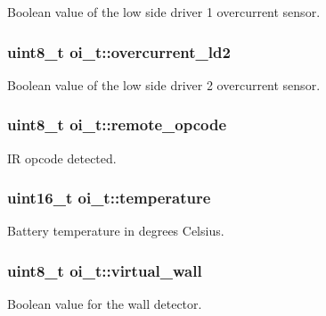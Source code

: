 Boolean value of the low side driver 1 overcurrent sensor. 

\hypertarget{structoi__t_a9f310b5da0c5b3d83a68ccbdc0339527}{
\subsubsection[{overcurrent\_\-ld2}]{\setlength{\rightskip}{0pt plus 5cm}uint8\_\-t {\bf oi\_\-t::overcurrent\_\-ld2}}}
\label{structoi__t_a9f310b5da0c5b3d83a68ccbdc0339527}


Boolean value of the low side driver 2 overcurrent sensor. 

\hypertarget{structoi__t_a7bfafbcc62f7eb3939b7bcd72065c377}{
\subsubsection[{remote\_\-opcode}]{\setlength{\rightskip}{0pt plus 5cm}uint8\_\-t {\bf oi\_\-t::remote\_\-opcode}}}
\label{structoi__t_a7bfafbcc62f7eb3939b7bcd72065c377}


IR opcode detected. 

\hypertarget{structoi__t_a9e162ade52f5b71fb92ac67c0cf76f76}{
\subsubsection[{temperature}]{\setlength{\rightskip}{0pt plus 5cm}uint16\_\-t {\bf oi\_\-t::temperature}}}
\label{structoi__t_a9e162ade52f5b71fb92ac67c0cf76f76}


Battery temperature in degrees Celsius. 

\hypertarget{structoi__t_a248f5290596d9691d446f8de7c38342f}{
\subsubsection[{virtual\_\-wall}]{\setlength{\rightskip}{0pt plus 5cm}uint8\_\-t {\bf oi\_\-t::virtual\_\-wall}}}
\label{structoi__t_a248f5290596d9691d446f8de7c38342f}


Boolean value for the wall detector. 

